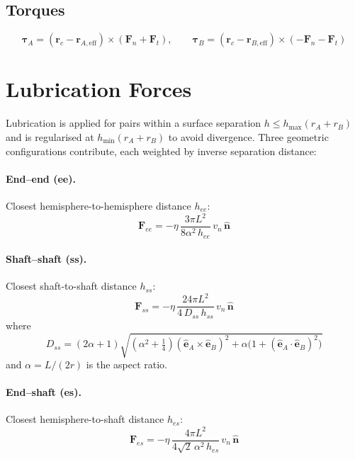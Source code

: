 \documentclass[12pt]{article}
\newcommand{\bs}[1]{\boldsymbol{#1}}
\begin{document}
\subsection{Torques}

\begin{equation}
  \bs{\tau}_A = (\bs{r}_c - \bs{r}_{A,\text{eff}}) \times (\bs{F}_n + \bs{F}_t),
  \qquad
  \bs{\tau}_B = (\bs{r}_c - \bs{r}_{B,\text{eff}}) \times (-\bs{F}_n - \bs{F}_t)
\end{equation}

\section{Lubrication Forces}

Lubrication is applied for pairs within a surface separation $h \le h_\text{max}(r_A+r_B)$
and is regularised at $h_\text{min}(r_A+r_B)$ to avoid divergence.  Three
geometric configurations contribute, each weighted by inverse separation distance:

\paragraph{End--end (ee).}  Closest hemisphere-to-hemisphere distance $h_{ee}$:
\begin{equation}
  \bs{F}_{ee} = -\eta\,\frac{3\pi L^2}{8\alpha^2\, h_{ee}}\, v_n\,\hat{\bs{n}}
\end{equation}

\paragraph{Shaft--shaft (ss).}  Closest shaft-to-shaft distance $h_{ss}$:
\begin{equation}
  \bs{F}_{ss} = -\eta\,\frac{24\pi L^2}{4\, D_{ss}\, h_{ss}}\, v_n\,\hat{\bs{n}}
\end{equation}
where
\begin{equation}
  D_{ss} = (2\alpha+1)\sqrt{(\alpha^2+\tfrac{1}{4})
            (\hat{\bs{e}}_A\!\times\!\hat{\bs{e}}_B)^2
            + \alpha\bigl(1 + (\hat{\bs{e}}_A\cdot\hat{\bs{e}}_B)^2\bigr)}
\end{equation}
and $\alpha = L/(2r)$ is the aspect ratio.

\paragraph{End--shaft (es).}  Closest hemisphere-to-shaft distance $h_{es}$:
\begin{equation}
  \bs{F}_{es} = -\eta\,\frac{4\pi L^2}{4\sqrt{2}\,\alpha^2\, h_{es}}\, v_n\,\hat{\bs{n}}
\end{equation}
\end{document}

